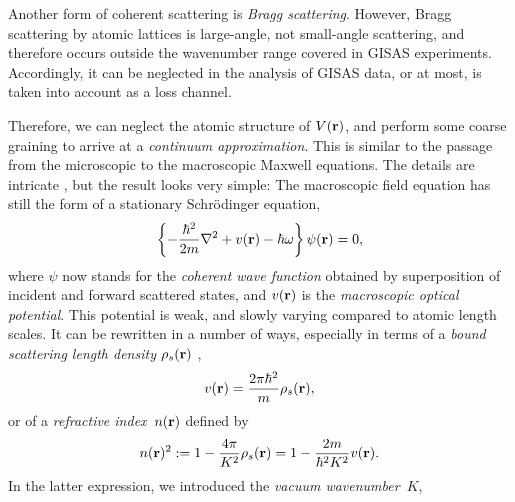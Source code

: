 Another form of coherent scattering is \textit{Bragg scattering}.
%
However, Bragg scattering by atomic lattices
is large-angle, not small-angle scattering,
and therefore occurs outside the wavenumber range
covered in GISAS experiments.
Accordingly, it can be neglected in the analysis of GISAS data,
or at most, is taken into account as a loss channel.

Therefore,
we can neglect the atomic structure of $V(\mathbf{r})$,
and perform some coarse graining to
arrive at a \textit{continuum approximation}.
%
This is 
similar to the passage from
the microscopic to the macroscopic Maxwell equations.
The details are intricate \cite{Sea89,Lax51},
but the result \cite[eq.~2.8.32]{Sea89} looks very simple:
The macroscopic field equation
has still the form of a stationary Schrödinger equation,
%
\begin{equation}\label{EmacrSchrodi}
  \left\{-\frac{\hbar^2}{2m}\mathbf{\nabla}^2+v(\mathbf{r})-\hbar\omega\right\} \psi(\mathbf{r}) = 0,
\end{equation}
%
%
where $\psi$ now stands for the \textit{coherent wave function}
%
%
obtained by superposition of
incident and forward scattered states,
and $v(\mathbf{r})$ is the \textit{macroscopic optical potential}.
%
This potential is weak, and slowly varying compared to atomic length scales.
It can be rewritten in a number of ways,
especially in terms of a
\textit{bound scattering length density}
%
$\rho_s(\mathbf{r})$ \cite[eq.\ 2.8.37]{Sea89},
%
\begin{equation}
  v(\mathbf{r})=\frac{2\pi \hbar^2}{m}\rho_s(\mathbf{r}),  
\end{equation}
or of a \textit{refractive index}~$n(\mathbf{r})$
%
%
defined by
\begin{equation}\label{EnRefrIndx}
  n(\mathbf{r})^2:=1-\frac{4\pi}{K^2}\rho_s(\mathbf{r}) = 1 -\frac{2m}{\hbar^2 K^2}v(\mathbf{r}).
\end{equation}
In the latter expression,
we introduced the \textit{vacuum wavenumber}~$K$,
